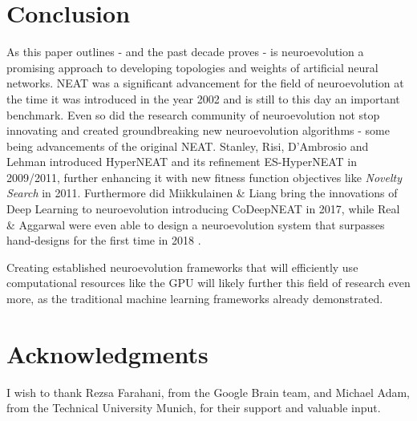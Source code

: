 \documentclass[journal, a4paper]{IEEEtran}
\begin{document}
\section{Conclusion}

As this paper outlines - and the past decade proves - is neuroevolution a promising approach to developing topologies and weights of artificial neural networks. NEAT was a significant advancement for the field of neuroevolution at the time it was introduced in the year 2002 and is still to this day an important benchmark. Even so did the research community of neuroevolution not stop innovating and created groundbreaking new neuroevolution algorithms - some being advancements of the original NEAT. Stanley, Risi, D'Ambrosio and Lehman introduced HyperNEAT \cite{sta09} and its refinement ES-HyperNEAT \cite{ris11} in 2009/2011, further enhancing it with new fitness function objectives like \textit{Novelty Search} \cite{leh11} in 2011. Furthermore did Miikkulainen \& Liang bring the innovations of Deep Learning to neuroevolution introducing CoDeepNEAT \cite{mii17} in 2017, while Real \& Aggarwal were even able to design a neuroevolution system that surpasses hand-designs for the first time in 2018 \cite{rea19}.

Creating established neuroevolution frameworks that will efficiently use computational resources like the GPU will likely further this field of research even more, as the traditional machine learning frameworks already demonstrated.




\section{Acknowledgments}

I wish to thank Rezsa Farahani, from the Google Brain team, and Michael Adam, from the Technical University Munich, for their support and valuable input.



\end{document}
